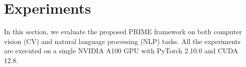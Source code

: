 \section{Experiments}


In this section, we evaluate the proposed PRIME framework on both computer vision (CV) and natural language processing (NLP) tasks. All the experiments are executed on a single NVIDIA A100 GPU with PyTorch 2.10.0 and CUDA 12.8. 

